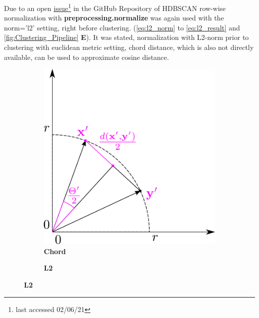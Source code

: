 Due to an open \href{https://github.com/scikit-learn-contrib/hdbscan/issues/69}{issue}\footnote{last accessed 02/06/21} in the GitHub Repository of \gls{HDBSCAN} row-wise normalization with \textbf{preprocessing.normalize} was again used with the \colorbox{backcolour}{norm='l2'} setting, right before clustering. (\autoref{eq:l2_norm} to \autoref{eq:l2_result} and \autoref{fig:Clustering_Pipeline} \textsf{\textbf{E}}). It was stated, normalization with L2-norm prior to clustering with euclidean metric setting, chord distance, which is also not directly available, can be used to approximate cosine distance.

\begin{figure}[!hbt]
    \centering
    \begin{subfigure}[b]{0.475\textwidth}
        \caption[Chord]{\textbf{Chord}}
        \label{subfig:Chord}
        \includegraphics[width=\textwidth]{Graphics/Chord.pdf}
    \end{subfigure}
    \hfill
    \begin{subfigure}[b]{0.475\textwidth}
        \caption[L2]{\textbf{L2}}
        \label{subfig:L2}            

\end{subfigure}
\end{figure}

